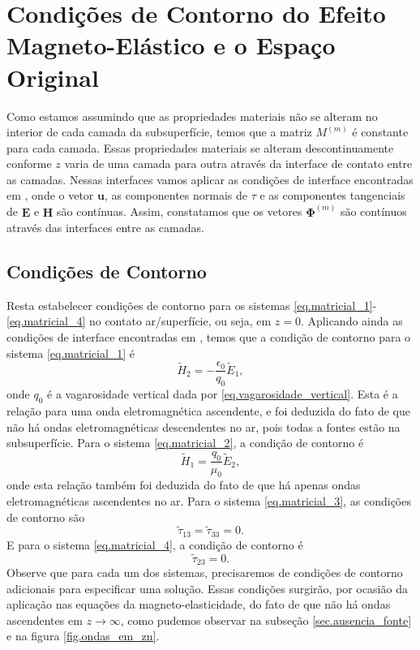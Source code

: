 \chapter{Condi\c{c}\~oes de Contorno do Efeito Magneto-El\'astico e o Espa\c{c}o Original}

Como estamos assumindo que as propriedades materiais n\~ao se alteram no interior de cada camada da subsuperf\'icie, temos que a matriz $M^{(m)}$ \'e constante para cada camada. Essas propriedades materiais se alteram descontinuamente conforme $z$ varia de uma camada para outra atrav\'es da interface de contato entre as camadas. Nessas interfaces vamos aplicar as condi\c{c}\~oes de interface encontradas em \cite{pride_94}, onde o vetor $\mathbf{u}$, as componentes normais de $\tau$ e as componentes  tangenciais de $\mathbf{E}$ e $\mathbf{H}$ s\~ao cont\'inuas. Assim, constatamos que os vetores $\mathbf{\Phi}^{(m)}$ s\~ao cont\'inuos atrav\'es das interfaces entre as camadas.

\section{Condi\c{c}\~oes de Contorno}
Resta estabelecer condi\c{c}\~oes de contorno para os sistemas \ref{eq.matricial_1}-\ref{eq.matricial_4} no contato ar/superf\'icie, ou seja, em $z=0$. Aplicando ainda as condi\c{c}\~oes de interface encontradas em \cite{pride_94}, temos que a condi\c{c}\~ao de contorno para o sistema \ref{eq.matricial_1} \'e
\begin{equation}\label{eq.cond_fron_1}
\tilde{H}_2=-\frac{\epsilon_0}{q_0}\tilde{E}_1,
\end{equation}
onde $q_0$ \'e a vagarosidade vertical dada por \ref{eq.vagarosidade_vertical}. Esta \'e a rela\c{c}\~ao para uma onda eletromagn\'etica ascendente, e foi deduzida do fato de que n\~ao h\'a ondas eletromagn\'eticas descendentes no ar, pois todas a fontes est\~ao na subsuperf\'icie.
Para o sistema \ref{eq.matricial_2}, a condi\c{c}\~ao de contorno \'e
\begin{equation}\label{eq.cond_fron_2}
\tilde{H}_1=\frac{q_0}{\mu_0}\tilde{E}_2,
\end{equation}
onde esta rela\c{c}\~ao tamb\'em foi deduzida do fato de que h\'a apenas ondas eletromagn\'eticas ascendentes no ar.
Para o sistema \ref{eq.matricial_3}, as condi\c{c}\~oes de contorno s\~ao
\begin{equation}\label{eq.cond_fron_3}
\tilde{\tau}_{13}=\tilde{\tau}_{33}=0.
\end{equation}
E para o sistema \ref{eq.matricial_4}, a condi\c{c}\~ao de contorno \'e
\begin{equation}\label{eq.cond_fron_4}
\tilde{\tau}_{23}=0.
\end{equation}
Observe que para cada um dos sistemas, precisaremos de condi\c{c}\~oes de contorno adicionais para especificar uma solu\c{c}\~ao. Essas condi\c{c}\~oes surgir\~ao, por ocasi\~ao da aplica\c{c}\~ao nas equa\c{c}\~oes da magneto-elasticidade, do fato de que n\~ao h\'a ondas ascendentes em $z\rightarrow\infty$, como pudemos observar na subse\c{c}\~ao \ref{sec.ausencia_fonte} e na figura \ref{fig.ondas_em_zn}.

